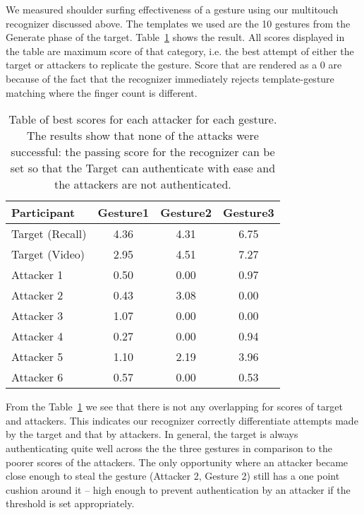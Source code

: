 \documentclass{sig-alternate-10pt}
\begin{document}
We measured shoulder surfing effectiveness of a gesture using our multitouch recognizer discussed above. The templates we used are the 10 gestures from the  Generate phase of the target. Table~\ref{tab:ShoulderSurfingReg} shows the result. All scores displayed in the table are maximum score of that category, i.e. the best attempt of either the target or attackers to replicate the gesture. Score that are rendered as a 0 are because of the fact that the recognizer immediately rejects template-gesture matching where the finger count is different. 

\begin{table}[h]
\begin{center}
\begin{tabular}{l|ccc}
Participant & Gesture1 & Gesture2 &Gesture3 \\\hline
Target (Recall) 	 & 4.36	 & 4.31 	 & 6.75 \\ 
Target (Video) 	 & 2.95 	 & 4.51 	 & 7.27 \\ 
Attacker 1 	 & 0.50	  &  0.00 	 &  0.97 \\ 
Attacker 2 	 & 0.43 	 &  3.08	 &  0.00 \\ 
Attacker 3 	 & 1.07 	 &  0.00 	 &  0.00 \\ 
Attacker 4 	 & 0.27 	 &  0.00 	 &  0.94 \\ 
Attacker 5 	 & 1.10 	 &  2.19 	 &  3.96 \\ 
Attacker 6 	 & 0.57 	 &  0.00 	 &  0.53 \\ 
\end{tabular}
\end{center}
\caption{Table of best scores for each attacker for each gesture. The results show that none of the attacks were successful: the passing score for the recognizer can be set so that
the Target can authenticate with ease and the attackers are not authenticated.}
\label{tab:ShoulderSurfingReg}
\end{table}



From the Table~\ref{tab:ShoulderSurfingReg} we see that there is not any overlapping for scores of target and attackers. This indicates our recognizer correctly differentiate attempts made by the target and that by attackers. In general, the target is always authenticating quite well across the the three gestures in comparison to the poorer scores of the attackers. The only opportunity where an attacker became close enough to steal the gesture (Attacker 2, Gesture 2) still has a one point cushion around it -- high enough to prevent authentication by an attacker if the threshold is set appropriately. 
\end{document}
